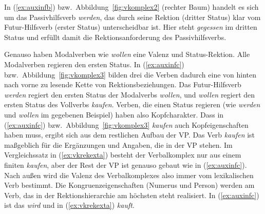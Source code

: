 \begin{exe}
  \ex\label{ex:futursterr}
  \begin{xlist}
  \end{xlist}
\end{exe}

In (\ref{ex:auxinfb}) bzw.\ Abbildung~\ref{fig:vkomplex2} (rechter Baum) handelt es sich um das Passivhilfsverb \textit{werden}, das durch seine Rektion (dritter Status) klar vom Futur-Hilfsverb (erster Status) unterscheidbar ist.
Hier steht \textit{gegessen} im dritten Status und erfüllt damit die Rektionsanforderung des Passivhilfsverbs.

Genauso haben Modalverben wie \textit{wollen} eine Valenz und Status-Rektion.
Alle Modalverben regieren den ersten Status.
In (\ref{ex:auxinfc}) bzw.\ Abbildung~\ref{fig:vkomplex3} bilden drei die Verben dadurch eine von hinten nach vorne zu lesende Kette von Rektionsbeziehungen.
Das Futur-Hilfsverb \textit{werden} regiert den ersten Status der Modalverbs \textit{wollen}, und \textit{wollen} regiert den ersten Status des Vollverbs \textit{kaufen}.
Verben, die einen Status regieren (wie \textit{werden} und \textit{wollen} im gegebenen Beispiel) haben also Kopfcharakter.
Dass in (\ref{ex:auxinfc}) bzw.\ Abbildung~\ref{fig:vkomplex3} \textit{kaufen} auch Kopfeigenschaften haben muss, ergibt sich aus dem restlichen Aufbau der VP.
Das Verb \textit{kaufen} ist maßgeblich für die Ergänzungen und Angaben, die in der VP stehen.
Im Vergleichssatz in (\ref{ex:vkrekexta}) besteht der Verbalkomplex nur aus einem finiten \textit{kaufen}, aber der Rest der VP ist genauso gebaut wie in (\ref{ex:auxinfc}).
Nach außen wird die Valenz des Verbalkomplexes also immer vom lexikalischen Verb bestimmt.
Die Kongruenzeigenschaften (Numerus und Person) werden am Verb, das in der Rektionshierarchie am höchsten steht realisiert.
In (\ref{ex:auxinfc}) ist das \textit{wird} und in (\ref{ex:vkrekexta}) \textit{kauft}.

\begin{exe}
\end{exe}


